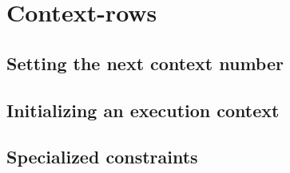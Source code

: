 \section{Context-rows}
\subsection{Setting the next context number \lispDone{}}      \label{hub: context rows: context constraints}         
\subsection{Initializing an execution context \lispDone{}}    \label{hub: context rows: initialize context}          
\subsection{Specialized constraints \lispDone{}}              \label{hub: context rows: specialized constraints}     
